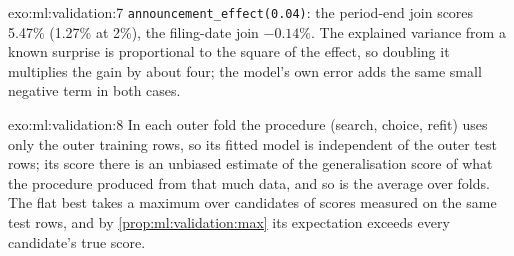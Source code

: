 \begin{solution}{exo:ml:validation:7}
\texttt{announcement\_effect(0.04)}: the period-end join scores 5.47\% (1.27\% at 2\%), the filing-date join $-0.14\%$.
The explained variance from a known surprise is proportional to the square of the effect, so doubling it multiplies
the gain by about four; the model's own error adds the same small negative term in both cases.
\end{solution}

\begin{solution}{exo:ml:validation:8}
In each outer fold the procedure (search, choice, refit) uses only the outer training rows, so its fitted model is
independent of the outer test rows; its score there is an unbiased estimate of the generalisation score of what the
procedure produced from that much data, and so is the average over folds. The flat best takes a maximum over candidates
of scores measured on the same test rows, and by \cref{prop:ml:validation:max} its expectation exceeds every candidate's
true score.
\end{solution}

